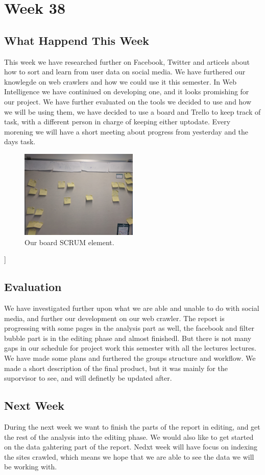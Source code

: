 \section*{Week 38}
\subsection*{What Happend This Week}
This week we have researched further on Facebook, Twitter and articels about
how to sort and learn from user data on social media. We have furthered our
knowlegde on web crawlers and how we could use it this semester. In Web
Intelligence we have continiued on developing one, and it looks promishing for
our project. We have further evaluated on the tools we decided to use and how we
will be using them, we have decided to use a board and Trello to keep track of
task, with a different person in charge of keeping either uptodate. Every
morening we will have a short meeting about progress from yesterday and the days
task.
\begin{figure}[H]
	\centering
	\includegraphics[width = 0.5\textwidth]{figures/Board.jpg}
	\caption{Our board SCRUM element.}
\end{figure}]

\subsection*{Evaluation}
We have investigated further upon what we are able and unable to do with social
media, and further our development on our web crawler. The report is
progressing with some pages in the analysis part as well, the facebook and
filter bubble part is in the editing phase and almost finishedl.
But there is not many gaps in our schedule for project work this semester with
all the lectures lectures.
We have made some plans and furthered the groups structure and workflow.
We made a short description of the final product, but it was mainly for the
suporvisor to see, and will definetly be updated after.

\subsection*{Next Week}
During the next week we want to finish the parts of the report in editing, and
get the rest of the analysis into the editing phase. We would also like to get
started on the data gahtering part of the report. Nedxt week will have focus on
indexing the sites crawled, which means we hope that we are able to see the data
we will be working with.